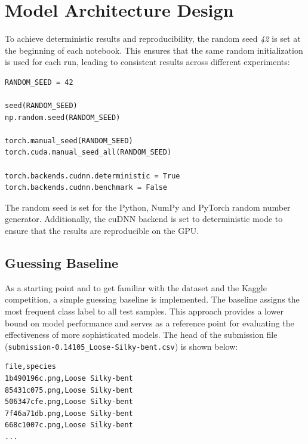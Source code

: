 \section{Model Architecture Design}

To achieve deterministic results and reproducibility, the random seed \textit{42} is set at the beginning of each notebook. This ensures that the same random initialization is used for each run, leading to consistent results across different experiments:

\begin{minipage}{0.9\linewidth}\begin{lstlisting}[caption={Settings to achieve deterministic results and ensure reproducibility.},label={lst:deterministic-results}]
RANDOM_SEED = 42

seed(RANDOM_SEED)
np.random.seed(RANDOM_SEED)

torch.manual_seed(RANDOM_SEED)
torch.cuda.manual_seed_all(RANDOM_SEED)

torch.backends.cudnn.deterministic = True
torch.backends.cudnn.benchmark = False
\end{lstlisting}\end{minipage}

The random seed is set for the Python, NumPy and PyTorch random number generator. Additionally, the cuDNN backend is set to deterministic mode to ensure that the results are reproducible on the GPU.

\subsection{Guessing Baseline}

As a starting point and to get familiar with the dataset and the Kaggle competition, a simple guessing baseline is implemented. The baseline assigns the most frequent class label to all test samples. This approach provides a lower bound on model performance and serves as a reference point for evaluating the effectiveness of more sophisticated models. The head of the submission file (\texttt{submission-0.14105\_Loose-Silky-bent.csv}) is shown below:

\begin{minipage}{0.9\linewidth}\begin{lstlisting}[language={},caption={Guessing baseline submission file.},label={lst:guessing-baseline}]
file,species
1b490196c.png,Loose Silky-bent
85431c075.png,Loose Silky-bent
506347cfe.png,Loose Silky-bent
7f46a71db.png,Loose Silky-bent
668c1007c.png,Loose Silky-bent
...
\end{lstlisting}\end{minipage}

